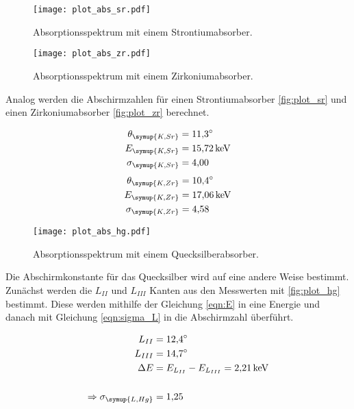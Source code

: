 \begin{figure}[H]
  \centering
  \texttt{[image: plot\_abs\_sr.pdf]}
  \caption{Absorptionsspektrum mit einem Strontiumabsorber.}
  \label{fig:plot_sr}
\end{figure}

\begin{figure}[H]
  \centering
  \texttt{[image: plot\_abs\_zr.pdf]}
  \caption{Absorptionsspektrum mit einem Zirkoniumabsorber.}
  \label{fig:plot_zr}
\end{figure}

Analog werden die Abschirmzahlen für einen Strontiumabsorber \eqref{fig:plot_sr} und einen
Zirkoniumabsorber \eqref{fig:plot_zr} berechnet.

\begin{align*}
  \theta_\symup{K,Sr} &= \SI{11.3}{\degree}\\
  E_\symup{K,Sr} &= \SI{15.72}{\kilo\eV}\\
  \sigma_\symup{K,Sr} &= \num{4.00}\\
\end{align*}
\begin{align*}
  \theta_\symup{K,Zr} &= \SI{10.4}{\degree}\\
  E_\symup{K,Zr} &= \SI{17.06}{\kilo\eV}\\
  \sigma_\symup{K,Zr} &=\num{4.58}\\
\end{align*}


\begin{figure}[H]
  \centering
  \texttt{[image: plot\_abs\_hg.pdf]}
  \caption{Absorptionsspektrum mit einem Quecksilberabsorber.}
  \label{fig:plot_hg}
\end{figure}

Die Abschirmkonstante für das Quecksilber wird auf eine andere Weise bestimmt. Zunächst
werden die $L_{II}$ und $L_{III}$ Kanten aus den Messwerten mit \eqref{fig:plot_hg} bestimmt.
Diese werden mithilfe der Gleichung \eqref{eqn:E} in eine Energie und danach
mit Gleichung \eqref{eqn:sigma_L} in die Abschirmzahl überführt.

\begin{align*}
  L_{II} &= \SI{12.4}{\degree}\\
  L_{III}&= \SI{14.7}{\degree}\\
  \Delta E &= E_{L_{II}}-E_{L_{III}} = \SI{2.21}{\kilo\eV}\\\\
  \Rightarrow \sigma_\symup{L,Hg} &= \num{1.25}\\
\end{align*}


